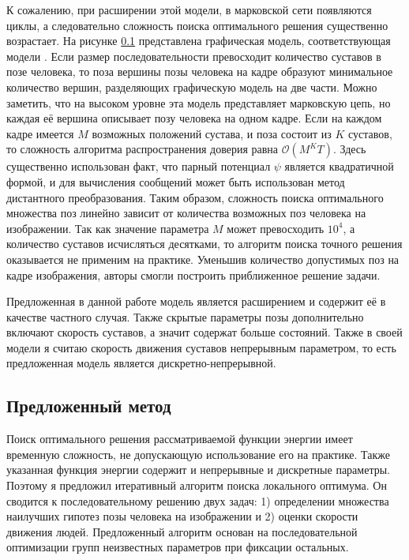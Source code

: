 К сожалению, при расширении этой модели, в марковской сети появляются циклы, а следовательно сложность поиска оптимального решения существенно возрастает. На рисунке \ref{} представлена графическая модель, соответствующая модели \cite{park2011n}. Если размер последовательности превосходит количество суставов в позе человека, то поза вершины позы человека на кадре образуют минимальное количество вершин, разделяющих графическую модель на две части. Можно заметить, что на высоком уровне эта модель представляет марковскую цепь, но каждая её вершина описывает позу человека на одном кадре. Если на каждом кадре имеется $M$ возможных положений сустава, и поза состоит из $K$ суставов, то сложность алгоритма распространения доверия равна $\mathcal{O}(M^{K}T)$. Здесь существенно использован факт, что парный потенциал $\psi$ является квадратичной формой, и для вычисления сообщений может быть использован метод дистантного преобразования. Таким образом, сложность поиска оптимального множества поз линейно зависит от количества возможных поз человека на изображении. Так как значение параметра $M$ может превосходить $10^4$, а количество суставов исчисляться десятками, то алгоритм поиска точного решения оказывается не применим на практике. Уменьшив количество допустимых поз на кадре изображения, авторы \cite{park2011n} смогли построить приближенное решение задачи.

Предложенная в данной работе модель является расширением \cite{park2011n} и содержит её в качестве частного случая. Также скрытые параметры позы дополнительно включают скорость суставов, а значит содержат больше состояний. Также в своей модели я считаю скорость движения суставов непрерывным параметром, то есть предложенная модель является дискретно-непрерывной.

\subsection{Предложенный метод}

Поиск оптимального решения рассматриваемой функции энергии имеет временную сложность, не допускающую использование его на практике. Также указанная функция энергии содержит и непрерывные и дискретные параметры. Поэтому я предложил итеративный алгоритм поиска локального оптимума. Он сводится к последовательному решению двух задач: 1) определении множества наилучших гипотез позы человека на изображении и 2) оценки скорости движения людей. Предложенный алгоритм основан на последовательной оптимизации групп неизвестных параметров при фиксации остальных.


